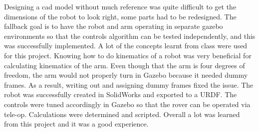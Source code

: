 Designing a cad model without much reference was quite difficult to get the dimensions of the robot to look right, some parts had to be redesigned. The fallback goal is to have the robot and arm operating in separate gazebo environments so that the controls algorithm can be tested independently, and this was successfully implemented. A lot of the concepts learnt from class were used for this project. Knowing how to do kinematics of a robot was very beneficial for calculating kinematics of the arm. Even though that the arm is four degrees of freedom, the arm would not properly turn in Gazebo because it needed dummy frames. As a result, writing out and assigning dummy frames fixed the issue. The robot was successfully created in SolidWorks and exported to a URDF. The controls were tuned accordingly in Gazebo so that the rover can be operated via tele-op. Calculations were determined and scripted. Overall a lot was learned from this project and it was a good experience.
